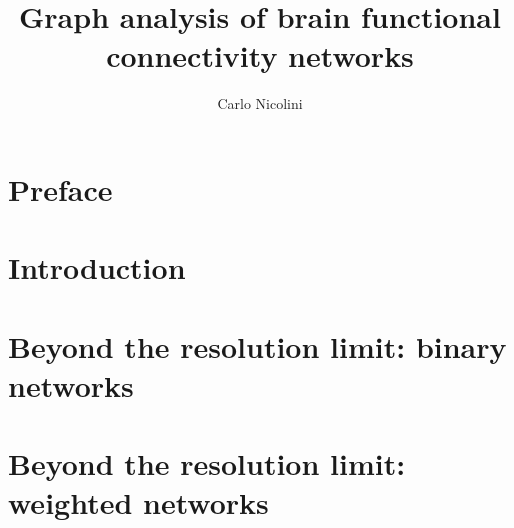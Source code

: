 
%

\title{Graph analysis of brain functional connectivity networks}
\author{Carlo Nicolini}

\newtheorem{obs}{Observation}
\newtheorem{props}{Proposition}



\maketitle
{}

\tableofcontents
\listoftodos

%

%

\chapter*{Preface}\label{chap:preface}



\chapter{Introduction}\label{chap:introduction}
	

\chapter{Beyond the resolution limit: binary networks}\label{chap:surprise}
	

\chapter{Beyond the resolution limit: weighted networks}\label{chap:asymptotical_surprise}
	


